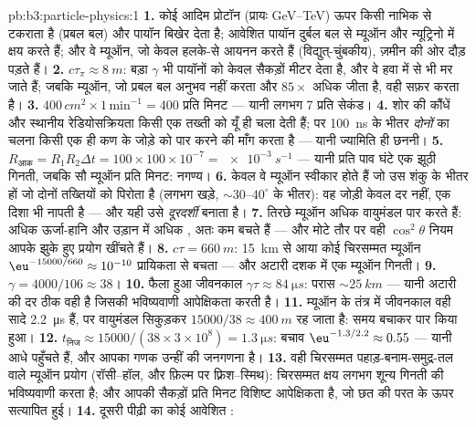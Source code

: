 \begin{solution}{pb:b3:particle-physics:1}
\textbf{1.} कोई आदिम प्रोटॉन (प्रायः \unit{GeV}--\unit{TeV})
ऊपर किसी नाभिक से टकराता है (प्रबल बल) और पायॉन बिखेर देता है;
आवेशित पायॉन दुर्बल बल से म्यूऑन और न्यूट्रिनो में क्षय करते हैं;
और वे म्यूऑन, जो केवल हलके-से आयनन करते हैं (विद्युत्-चुंबकीय),
ज़मीन की ओर दौड़ पड़ते हैं।
\textbf{2.} $c\tau_\pi \approx \qty{8}{m}$: बड़ा $\gamma$ भी
पायॉनों को केवल सैकड़ों मीटर देता है, और वे हवा में  से भी मर जाते हैं; जबकि म्यूऑन, जो प्रबल बल अनुभव
नहीं करता और $85\times$ अधिक जीता है, वही सफ़र करता है।
\textbf{3.} $400\,\unit{cm^2}\times1\,\text{min}^{-1} = 400$
प्रति मिनट --- यानी लगभग 7 प्रति सेकंड।
\textbf{4.} शोर की कौंधें और स्थानीय रेडियोसक्रियता किसी एक
तख्ती को यूँ ही चला देती हैं; पर \qty{100}{ns} के भीतर
\emph{दोनों} का चलना किसी एक ही कण के जोड़े को पार करने की माँग करता
है --- यानी ज्यामिति ही छननी।
\textbf{5.} $R_{\text{आक}} = R_1R_2\Delta t = 100\times100
\times10^{-7} = \qty{e-3}{s^{-1}}$ --- यानी प्रति पाव घंटे एक झूठी
गिनती, जबकि सौ म्यूऑन प्रति मिनट: नगण्य।
\textbf{6.} केवल वे म्यूऑन स्वीकार होते हैं जो उस शंकु के भीतर
हों जो दोनों तख्तियों को पिरोता है (लगभग खड़े, ${\sim}30$--$40^\circ$
के भीतर): वह जोड़ी केवल दर नहीं, एक दिशा भी नापती है ---
और यही उसे \emph{दूरदर्शी} बनाता है।
\textbf{7.} तिरछे म्यूऑन अधिक वायुमंडल पार करते हैं: अधिक
ऊर्जा-हानि और उड़ान में अधिक , अतः कम बचते हैं ---
और मोटे तौर पर वही $\cos^2\theta$ नियम आपके झुके हुए प्रयोग खींचते हैं।
\textbf{8.} $c\tau = \qty{660}{m}$: \qty{15}{km} से आया कोई
चिरसम्मत म्यूऑन
$\eu^{-15000/660} \approx 10^{-10}$ प्रायिकता से बचता --- और अटारी
दशक में एक म्यूऑन गिनती।
\textbf{9.} $\gamma = 4000/106 \approx 38$।
\textbf{10.} फैला हुआ जीवनकाल $\gamma\tau \approx
\qty{84}{\micro s}$: परास ${\sim}\qty{25}{km}$ --- यानी अटारी की
दर ठीक वही है जिसकी भविष्यवाणी आपेक्षिकता करती है।
\textbf{11.} म्यूऑन के तंत्र में जीवनकाल वही सादे
\qty{2.2}{\micro s} हैं, पर वायुमंडल सिकुड़कर
$15000/38 \approx \qty{400}{m}$ रह जाता है: समय बचाकर पार किया हुआ।
\textbf{12.} $t_{\text{निज}} \approx 15000/(38\times3\times
10^8) = \qty{1.3}{\micro s}$: बचाव $\eu^{-1.3/2.2} \approx
0.55$ --- यानी आधे पहुँचते हैं, और आपका गणक उन्हीं की जनगणना है।
\textbf{13.} वही चिरसम्मत पहाड़-बनाम-समुद्र-तल वाले म्यूऑन
प्रयोग (रॉसी--हॉल, और फ़िल्म पर फ़्रिश--स्मिथ): चिरसम्मत
क्षय लगभग शून्य गिनती की भविष्यवाणी करता है; और आपकी सैकड़ों प्रति
मिनट विशिष्ट आपेक्षिकता है, जो छत की परत के ऊपर सत्यापित हुई।
\textbf{14.} दूसरी पीढ़ी का कोई आवेशित :

\end{solution}
